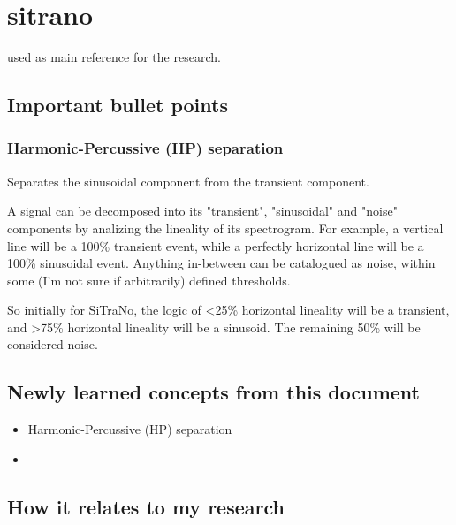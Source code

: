 \section{sitrano}

\cite{sitrano} used as main reference for the research.

\subsection{Important bullet points}

\subsubsection{Harmonic-Percussive (HP) separation}

Separates the sinusoidal component from the transient component.

A signal can be decomposed into its "transient", "sinusoidal" and "noise" components by analizing the lineality of its spectrogram. For example, a vertical line will be a 100\% transient event, while a perfectly horizontal line will be a 100\% sinusoidal event. Anything in-between can be catalogued as noise, within some (I'm not sure if arbitrarily) defined thresholds.

So initially for SiTraNo, the logic of <25\% horizontal lineality will be a transient, and >75\% horizontal lineality will be a sinusoid. The remaining 50\% will be considered noise.

\subsection{Newly learned concepts from this document}

\begin{itemize}
    \item Harmonic-Percussive (HP) separation
    \item 
\end{itemize}

\subsection{How it relates to my research}